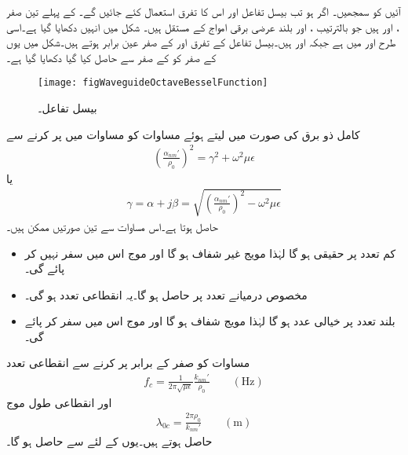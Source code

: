 آئیں  کو سمجھیں۔ اگر  ہو تب بیسل تفاعل  اور اس کا تفرق  استعمال کئے جائیں گے۔ کے  پہلے تین صفر ،  اور  ہیں جو بالترتیب  ،  اور   بلند عرضی برقی امواج کے مستقل ہیں۔ شکل  میں انہیں دکھایا گیا ہے۔اسی طرح  اور  میں  ہے  جبکہ  اور  ہیں۔بیسل تفاعل کے تفرق  اور  کے صفر عین برابر ہوتے ہیں۔شکل میں یوں  کے صفر کو  کے صفر سے حاصل کیا گیا دکھایا گیا ہے۔
\begin{figure}
\centering
\texttt{[image: figWaveguideOctaveBesselFunction]}
\caption{بیسل تفاعل۔}
\label{شکل_مویج_بیسل_تفاعل_الف}
\end{figure}

کامل ذو برق کی صورت میں  لیتے ہوئے مساوات  کو مساوات  میں پر کرنے سے
\begin{align*}
\left(\frac{\alpha_{nm}'}{\rho_0}\right)^2=\gamma^2+\omega^2 \mu \epsilon
\end{align*}
یا
\begin{align}\label{مساوات_مویج_ترسیلی_مستقل_ب}
\gamma=\alpha+j \beta=\sqrt{\left(\frac{\alpha_{nm}'}{\rho_0}\right)^2-\omega^2 \mu \epsilon}
\end{align}
حاصل ہوتا ہے۔اس مساوات سے تین صورتیں ممکن ہیں۔
\begin{itemize}
\item
کم تعدد پر حقیقی  ہو گا لہٰذا مویج غیر شفاف ہو گا اور موج اس میں سفر نہیں کر پائے گی۔
\item
مخصوص درمیانے تعدد پر  حاصل ہو گا۔یہ انقطاعی تعدد ہو گی۔
\item
بلند تعدد پر  خیالی عدد ہو گا لہٰذا مویج شفاف ہو گا اور موج اس میں سفر کر پائے گی۔
\end{itemize}

مساوات  کو صفر کے برابر پر کرنے سے انقطاعی تعدد
\begin{align}
f_c=\frac{1}{2\pi\sqrt{\mu \epsilon}} \frac{k_{nm}'}{\rho_0} \quad \quad (\si{\hertz})
\end{align}
اور انقطاعی طول موج
\begin{align}
\lambda_{0c}=\frac{2\pi \rho_0}{k_{nm}'} \quad \quad (\si{\meter})
\end{align}
حاصل ہوتے ہیں۔یوں  کے لئے  سے  حاصل ہو گا۔

